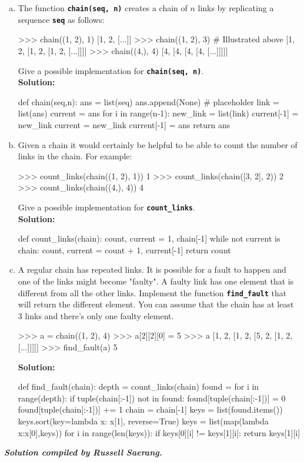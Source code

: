 \begin{enumerate}[(a)]
\item The function \texttt{\bfseries chain(seq, n)} creates a chain of $n$ links by replicating a 
sequence \texttt{\bfseries seq} as follows:
\begin{python}
>>> chain((1, 2), 1)
[1, 2, [...]]
>>> chain((1, 2), 3) # Illustrated above
[1, 2, [1, 2, [1, 2, [...]]]]
>>> chain((4,), 4)
[4, [4, [4, [4, [...]]]]]
\end{python}
Give a possible implementation for \texttt{\bfseries chain(seq, n)}. \\
\textbf{Solution:}
\begin{python}
def chain(seq,n):
    ans = list(seq)
    ans.append(None) # placeholder
    link = list(ans)
    current = ans
    for i in range(n-1):
        new_link = list(link)
        current[-1] = new_link
        current = new_link
    current[-1] = ans
    return ans
\end{python}

\item Given a chain it would certainly be helpful to be able to count the number of links in the
chain. For example:
\begin{python}
>>> count_links(chain((1, 2), 1))
1
>>> count_links(chain([3, 2], 2))
2
>>> count_links(chain((4,), 4))
4
\end{python}
Give a possible implementation for \texttt{\bfseries count\_links}. \\
\textbf{Solution:}
\begin{python}
def count_links(chain):
    count, current = 1, chain[-1]
    while not current is chain:
        count, current = count + 1, current[-1]
    return count
\end{python}

\item A regular chain has repeated links. It is possible for a fault to happen and one of the links
might become "faulty". A faulty link has one element that is different from all the other links.
Implement the function \texttt{\bfseries find\_fault} that will return the different element. You can assume that
the chain has at least 3 links and there’s only one faulty element.
\begin{python}
>>> a = chain((1, 2), 4)
>>> a[2][2][0] = 5
>>> a
[1, 2, [1, 2, [5, 2, [1, 2, [...]]]]]
>>> find_fault(a)
5
\end{python}
\textbf{Solution:}
\begin{python}
def find_fault(chain):
    depth = count_links(chain)
    found = {}
    for i in range(depth):
        if tuple(chain[:-1]) not in found:
            found[tuple(chain[:-1])] = 0
        found[tuple(chain[:-1])] += 1
        chain = chain[-1]
    keys = list(found.items())
    keys.sort(key=lambda x: x[1], reverse=True)
    keys = list(map(lambda x:x[0],keys))
    for i in range(len(keys)):
        if keys[0][i] != keys[1][i]:
            return keys[1][i]
\end{python}
\end{enumerate}

\begin{flushright}
\vspace{2 cm}\textbf{\textit{Solution compiled by Russell Saerang.}}
\end{flushright}
